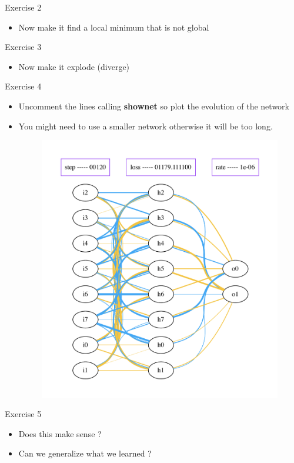 \documentclass{beamer}
\begin{document}
\begin{frame}{Exercise 2}
   \begin{itemize}
        \item Now make it find a local minimum that is not global
   \end{itemize} 
\end{frame}



\begin{frame}{Exercise 3}
   \begin{itemize}
       \item Now make it explode (diverge)
   \end{itemize} 
\end{frame}

\begin{frame}{Exercise 4}
   \begin{itemize}
       \item  Uncomment the lines calling \textbf{{show\textunderscore net}} so
           plot the evolution of the network
        \item You might need to use a smaller network otherwise it will be too
            long.
            \begin{figure}[htpb]
                \centering
                \includegraphics[width=0.5\linewidth]{net_120}
                \caption{}
                \label{fig:}
            \end{figure}
   \end{itemize} 
\end{frame}

\begin{frame}{Exercise 5}
    \begin{itemize}
        \item Does this make sense ?
            \item Can we generalize what we learned ?
    \end{itemize}
\end{frame}
\end{document}

